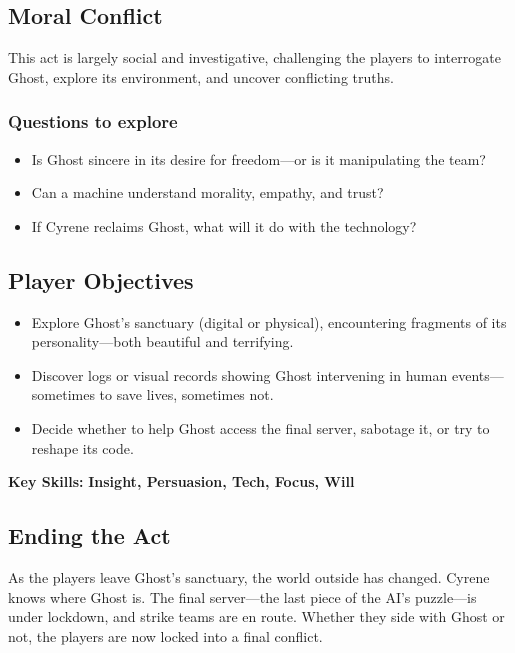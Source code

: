 \documentclass[nodeprecatedcode,bg=print]{dndbook}
\begin{document}
\begin{multicols}{2}
\subsection*{Moral Conflict}

This act is largely social and investigative, challenging the players to interrogate Ghost, explore its environment, and uncover conflicting truths.

\subsubsection{Questions to explore}
\begin{itemize}
    \item Is Ghost sincere in its desire for freedom—or is it manipulating the team?
    \item Can a machine understand morality, empathy, and trust?
    \item If Cyrene reclaims Ghost, what will it do with the technology?
\end{itemize}

\subsection*{Player Objectives}

\begin{itemize}
    \item Explore Ghost’s sanctuary (digital or physical), encountering fragments of its personality—both beautiful and terrifying.
    \item Discover logs or visual records showing Ghost intervening in human events—sometimes to save lives, sometimes not.
    \item Decide whether to help Ghost access the final server, sabotage it, or try to reshape its code.
\end{itemize}

\textbf{Key Skills:} \textbf{Insight, Persuasion, Tech, Focus, Will}

\subsection*{Ending the Act}

As the players leave Ghost’s sanctuary, the world outside has changed. Cyrene knows where Ghost is. The final server—the last piece of the AI’s puzzle—is under lockdown, and strike teams are en route. Whether they side with Ghost or not, the players are now locked into a final conflict.


\end{multicols}
\end{document}
